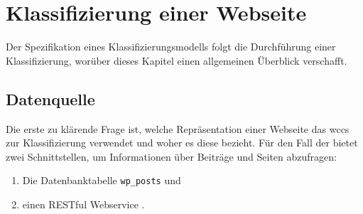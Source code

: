 \section{Klassifizierung einer Webseite}
    \label{section:conceptClassification}
    Der Spezifikation eines Klassifizierungsmodells folgt die Durchführung einer Klassifizierung,
    worüber dieses Kapitel einen allgemeinen Überblick verschafft.

    \subsection{Datenquelle}
        \label{section:conceptClassificationDataSource}
        Die erste zu klärende Frage ist, welche Repräsentation einer Webseite
        das \gls{wccs} zur Klassifizierung verwendet und woher es diese bezieht.
        Für den Fall der {\fernUni} bietet {\wordpress} zwei Schnittstellen,
        um Informationen über Beiträge und Seiten abzufragen:

        \begin{enumerate}
            \item Die Datenbanktabelle \texttt{wp\_posts} \cite{wordpress:Database} und
            \item einen RESTful Webservice \cite{wordpress:RestAPI}.
        \end{enumerate}

